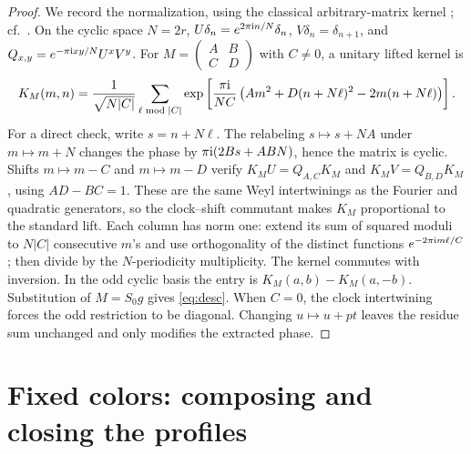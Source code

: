\documentclass[11pt]{article}
\newcommand\ii{{\rm i}}
\begin{document}
\begin{proof}
We record the normalization, using the classical arbitrary-matrix kernel \cite[Prop.~2.6]{Jeffrey}; cf.~\cite{HT}. On the cyclic space \(N=2r\), \(U\delta_n=e^{2\pi\ii n/N}\delta_n\), \(V\delta_n=\delta_{n+1}\), and \(Q_{x,y}=e^{-\pi\ii xy/N}U^xV^y\). For \(M=\left(\begin{smallmatrix}A&B\\C&D\end{smallmatrix}\right)\) with \(C\ne0\), a unitary lifted kernel is
\begin{equation}\label{eq:kernel}
 K_M(m,n)=\frac1{\sqrt{N|C|}}\sum_{\ell\bmod |C|}
   \exp\left[\frac{\pi\ii}{NC}
       \left(A m^2+D(n+N\ell)^2-2m(n+N\ell)\right)\right].
\end{equation}
For a direct check, write \(s=n+N\ell\). The relabeling \(s\mapsto s+NA\) under \(m\mapsto m+N\) changes the phase by \(\pi\ii(2Bs+ABN)\), hence the matrix is cyclic. Shifts \(m\mapsto m-C\) and \(m\mapsto m-D\) verify \(K_MU=Q_{A,C}K_M\) and \(K_MV=Q_{B,D}K_M\), using \(AD-BC=1\). These are the same Weyl intertwinings as the Fourier and quadratic generators, so the clock--shift commutant makes \(K_M\) proportional to the standard lift. Each column has norm one: extend its sum of squared moduli to \(N|C|\) consecutive \(m\)'s and use orthogonality of the distinct functions \(e^{-2\pi\ii m\ell/C}\); then divide by the \(N\)-periodicity multiplicity. The kernel commutes with inversion. In the odd cyclic basis the entry is \(K_M(a,b)-K_M(a,-b)\). Substitution of \(M=S_0g\) gives \eqref{eq:desc}. When \(C=0\), the clock intertwining forces the odd restriction to be diagonal. Changing \(u\mapsto u+pt\) leaves the residue sum unchanged and only modifies the extracted phase.
\end{proof}

\section{Fixed colors: composing and closing the profiles}
\end{document}
